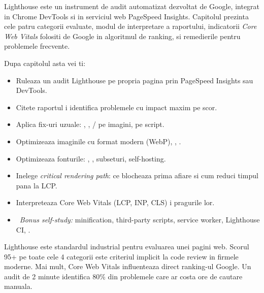 \clearpage
{}
\setcounter{section}{0}
{}

Lighthouse este un instrument de audit automatizat dezvoltat de Google, integrat in Chrome DevTools si in serviciul web PageSpeed Insights. Capitolul prezinta cele patru categorii evaluate, modul de interpretare a raportului, indicatorii \emph{Core Web Vitals} folositi de Google in algoritmul de ranking, si remedierile pentru problemele frecvente.

\bigskip

\begin{outcomes}
Dupa capitolul asta vei ti:
\begin{itemize}[itemsep=1pt]
  \item Ruleaza un audit Lighthouse pe propria pagina prin PageSpeed Insights sau DevTools.
  \item Citete raportul i identifica problemele cu impact maxim pe scor.
  \item Aplica fix-uri uzuale: , , / pe imagini,  pe script.
  \item Optimizeaza imaginile cu format modern (WebP), , .
  \item Optimizeaza fonturile: , , subseturi, self-hosting.
  \item Inelege \emph{critical rendering path}: ce blocheaza prima afiare si cum reduci timpul pana la LCP.
  \item Interpreteaza Core Web Vitals (LCP, INP, CLS) i pragurile lor.
  \item \faRocket\ \emph{Bonus self-study:} minification, third-party scripts, service worker, Lighthouse CI, .
\end{itemize}
\end{outcomes}

\begin{whymatters}
Lighthouse este standardul industrial pentru evaluarea unei pagini web. Scorul 95+ pe toate cele 4 categorii este criteriul implicit la code review in firmele moderne. Mai mult, Core Web Vitals influenteaza direct ranking-ul Google. Un audit de 2 minute identifica 80\% din problemele care ar costa ore de cautare manuala.
\end{whymatters}

